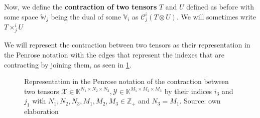 \documentclass[11pt,a4paper,openright,oneside]{book}
\numberwithin{equation}{section}
\newcommand{\figref}[1]{\cref{#1}}
\begin{document}
Now, we define the \textbf{contraction of two tensors} $T$ and $U$ defined as before with some space $\mathbb{W}_j$ being the dual of
some $\mathbb{V}_i$ as $\mathcal{C}_j^i (T \otimes U)$. We will sometimes write $T \times_j^i U$

We will represent the contraction between two tensors 
as their representation in the Penrose notation with the edges that represent the indexes that are contracting by joining them, as seen in \figref{fig:tencon}.


\begin{figure}[h]
    \begin{center}
    \hfill
\begin{minipage}{0.2\textwidth}
\end{minipage}
\hfill
\begin{minipage}{0.225\textwidth}
\end{minipage}
\hfill
\begin{minipage}{0.225\textwidth}
\end{minipage}
\end{center}

\caption{
    Representation in the Penrose notation of the contraction between two tensors $\mathcal{X} \in \mathbb{K}^{N_1 \times N_2 \times N_3}, \mathcal{Y} \in \mathbb{K}^{M_1 \times M_2 \times M_3}$
    by their indices $i_3$ and $j_1$ with $N_1, N_2, N_3, M_1, M_2, M_3 \in \mathbb{Z}_+$ and $N_3 = M_1$. Source: own elaboration
}
\label{fig:tencon}
\end{figure}
\end{document}
